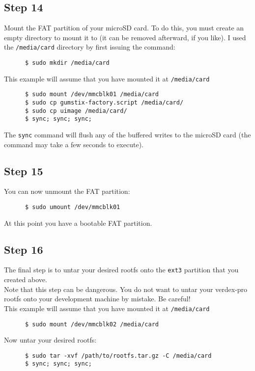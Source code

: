 \documentclass{article}
\begin{document}
   \subsection*{Step 14}
      Mount the FAT partition of your microSD card. To do this, you must create
      an empty directory to mount it to (it can be removed afterward, if you
      like). I used the \texttt{/media/card} directory by first issuing the
      command:
      \begin{verbatim}
      $ sudo mkdir /media/card
      \end{verbatim}
      This example will assume that you have mounted it at \texttt{/media/card}
      \begin{verbatim}
      $ sudo mount /dev/mmcblk01 /media/card 
      $ sudo cp gumstix-factory.script /media/card/
      $ sudo cp uimage /media/card/
      $ sync; sync; sync; 
      \end{verbatim}
      The \texttt{sync} command will flush any of the buffered writes to the
      microSD card (the command may take a few seconds to execute). 
   \subsection*{Step 15}
      You can now unmount the FAT partition: 
      \begin{verbatim}
      $ sudo umount /dev/mmcblk01
      \end{verbatim}
      At this point you have a bootable FAT partition. 
   \subsection*{Step 16}
      The final step is to untar your desired rootfs onto the \texttt{ext3}
      partition that you created above. \\

      Note that this step can be dangerous.  You do not want to untar your
      verdex-pro rootfs onto your development machine  by mistake. Be
      careful! \\

      This example will assume that you have mounted it at \texttt{/media/card}
      \begin{verbatim}
      $ sudo mount /dev/mmcblk02 /media/card 
      \end{verbatim}
      Now untar your desired rootfs: 
      \begin{verbatim}
      $ sudo tar -xvf /path/to/rootfs.tar.gz -C /media/card
      $ sync; sync; sync; 
      \end{verbatim}
\end{document}
